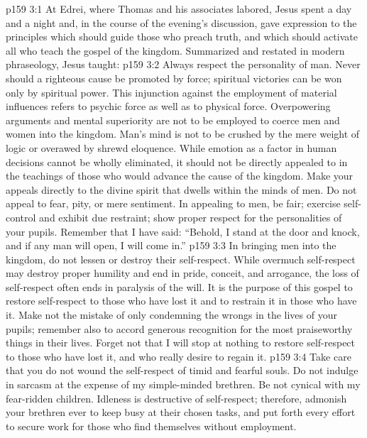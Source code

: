 \vs p159 3:1 At Edrei, where Thomas and his associates labored, Jesus spent a day and a night and, in the course of the evening’s discussion, gave expression to the principles which should guide those who preach truth, and which should activate all who teach the gospel of the kingdom. Summarized and restated in modern phraseology, Jesus taught:
\vs p159 3:2 \pc Always respect the personality of man. Never should a righteous cause be promoted by force; spiritual victories can be won only by spiritual power. This injunction against the employment of material influences refers to psychic force as well as to physical force. Overpowering arguments and mental superiority are not to be employed to coerce men and women into the kingdom. Man’s mind is not to be crushed by the mere weight of logic or overawed by shrewd eloquence. While emotion as a factor in human decisions cannot be wholly eliminated, it should not be directly appealed to in the teachings of those who would advance the cause of the kingdom. Make your appeals directly to the divine spirit that dwells within the minds of men. Do not appeal to fear, pity, or mere sentiment. In appealing to men, be fair; exercise self\hyp{}control and exhibit due restraint; show proper respect for the personalities of your pupils. Remember that I have said: \textcolor{ubdarkred}{“Behold, I stand at the door and knock, and if any man will open, I will come in.”}
\vs p159 3:3 In bringing men into the kingdom, do not lessen or destroy their self\hyp{}respect. While overmuch self\hyp{}respect may destroy proper humility and end in pride, conceit, and arrogance, the loss of self\hyp{}respect often ends in paralysis of the will. It is the purpose of this gospel to restore self\hyp{}respect to those who have lost it and to restrain it in those who have it. Make not the mistake of only condemning the wrongs in the lives of your pupils; remember also to accord generous recognition for the most praiseworthy things in their lives. Forget not that I will stop at nothing to restore self\hyp{}respect to those who have lost it, and who really desire to regain it.
\vs p159 3:4 Take care that you do not wound the self\hyp{}respect of timid and fearful souls. Do not indulge in sarcasm at the expense of my simple\hyp{}minded brethren. Be not cynical with my fear\hyp{}ridden children. Idleness is destructive of self\hyp{}respect; therefore, admonish your brethren ever to keep busy at their chosen tasks, and put forth every effort to secure work for those who find themselves without employment.
